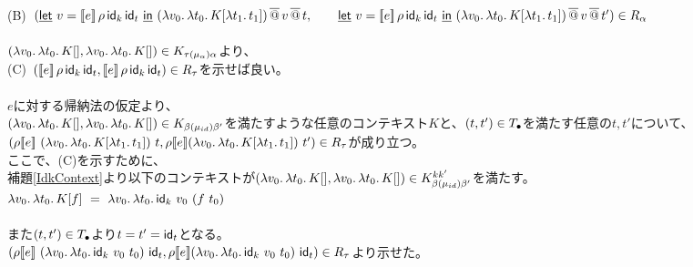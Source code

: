 \\
(B)\ $(\underline{\textsf{let}}\ v=[\![{e}]\!]\,\rho\,\textsf{id}_k\,\textsf{id}_t\ \underline{\textsf{in}}\ {{(\lambda{v_0}.\,{\lambda{t_0}.\,{K[\lambda{t_1}.\,{t_1}]}})}\,\overline{@}\,{v}}\,\overline{@}\,{t},\\
\qquad  \underline{\textsf{let}}\ v=[\![{e}]\!]\,\rho\,\textsf{id}_k\,\textsf{id}_t\ \underline{\textsf{in}}\ {{(\lambda{v_0}.\,{\lambda{t_0}.\,{K[\lambda{t_1}.\,{t_1}]}})}\,\overline{@}\,{v}}\,\overline{@}\,{t'})\in R_{\alpha}$ \\
\\
$(\lambda{v_0}.\,{\lambda{t_0}.\,{K[]}}, \lambda{v_0}.\,{\lambda{t_0}.\,{K[]}})\in  K_{\tau(\mu_{\alpha})\alpha}$より、\\
(C)\ $([\![{e}]\!]\,\rho\,\textsf{id}_k\,\textsf{id}_t,[\![{e}]\!]\,\rho\,\textsf{id}_k\,\textsf{id}_t)\in R_{\tau}$を示せば良い。\\
\\
$e$に対する帰納法の仮定より、\\
$(\lambda{v_0}.\,{\lambda{t_0}.\,{K[]}}, \lambda{v_0}.\,{\lambda{t_0}.\,{K[]}})\in  K_{\beta(\mu_{id})\beta'}$を満たすような任意のコンテキスト$K$と、$(t, t') \in T_{\bullet}$を満たす任意の$t, t'$について、\\
$(\rho \CPSTh{e}\ \LamP{v_0}{\Lam{t_0}{K[\Lam{t_1}{t_1}]}}\ t, \rho \CPSTh{e} \LamP{v_0}{\Lam{t_0}{K[\Lam{t_1}{t_1}]}}\ t')\in R_{\tau}$が成り立つ。\\
ここで、(C)を示すために、\\
補題\ref{IdkContext}より以下のコンテキストが$(\lambda{v_0}.\,{\lambda{t_0}.\,{K[]}}, \lambda{v_0}.\,{\lambda{t_0}.\,{K[]}})\in  K^{kk'}_{\beta(\mu_{id})\beta'}$を満たす。\\
$\Lam{v_0}{\Lam{t_0}{K[f]}}\ =\ \Lam{v_0}{\Lam{t_0}{\Idk\ v_0\ (f\ t_0)}}$\\
\\
また$(t, t') \in T_{\bullet}$より$t=t'=\textsf{id}_t$となる。\\
$(\rho \CPSTh{e}\ \LamP{v_0}{\Lam{t_0}{\Idk\ v_0\ t_0}}\ \Idt, \rho \CPSTh{e} \LamP{v_0}{\Lam{t_0}{\Idk\ v_0\ t_0}}\ \Idt)\in R_{\tau}$より示せた。
